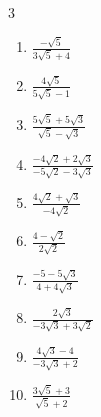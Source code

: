 \begin{multicols}{3}
\begin{enumerate}

  \item $\displaystyle \frac{-\sqrt{5}}{3\sqrt{5}+4}$


  \item $\displaystyle \frac{4\sqrt{5}}{5\sqrt{5}-1}$


  \item $\displaystyle \frac{5\sqrt{5}+5\sqrt{3}}{\sqrt{5}-\sqrt{3}}$


  \item $\displaystyle \frac{-4\sqrt{2}+2\sqrt{3}}{-5\sqrt{2}-3\sqrt{3}}$


\columnbreak %

  \item $\displaystyle \frac{4\sqrt{2}+\sqrt{3}}{-4\sqrt{2}}$


  \item $\displaystyle \frac{4-\sqrt{2}}{2\sqrt{2}}$


  \item $\displaystyle \frac{-5-5\sqrt{3}}{4+4\sqrt{3}}$


  \item $\displaystyle \frac{2\sqrt{3}}{-3\sqrt{3}+3\sqrt{2}}$


  \item $\displaystyle \frac{4\sqrt{3}-4}{-3\sqrt{3}+2}$


\columnbreak %

\resetques

  \item $\displaystyle \frac{3\sqrt{5}+3}{\sqrt{5}+2}$



\end{enumerate}
\end{multicols}
